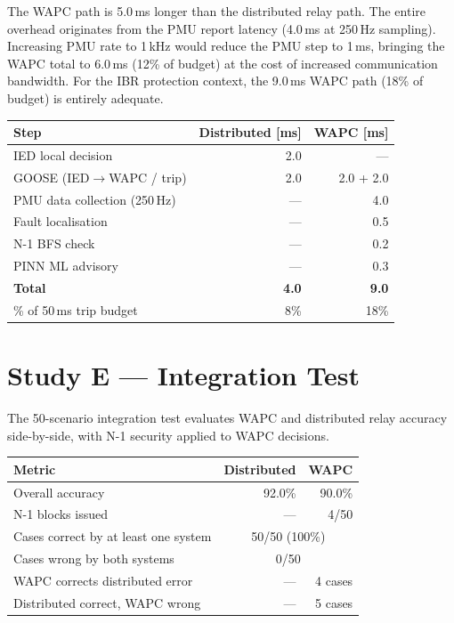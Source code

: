 \documentclass[11pt,a4paper]{article}
\begin{document}
\noindent
The WAPC path is 5.0\,ms longer than the distributed relay path.  The entire
overhead originates from the PMU report latency (4.0\,ms at 250\,Hz sampling).
Increasing PMU rate to 1\,kHz would reduce the PMU step to 1\,ms, bringing
the WAPC total to 6.0\,ms (12\% of budget) at the cost of increased
communication bandwidth.  For the IBR protection context, the 9.0\,ms WAPC
path (18\% of budget) is entirely adequate.

\begin{center}
\begin{tabular}{@{}lrr@{}}
\toprule
Step & Distributed [ms] & WAPC [ms] \\
\midrule
IED local decision & 2.0 & --- \\
GOOSE (IED$\to$WAPC / trip) & 2.0 & 2.0 + 2.0 \\
PMU data collection (250\,Hz) & --- & 4.0 \\
Fault localisation & --- & 0.5 \\
N-1 BFS check & --- & 0.2 \\
PINN ML advisory & --- & 0.3 \\
\midrule
\textbf{Total} & \textbf{4.0} & \textbf{9.0} \\
\% of 50\,ms trip budget & 8\% & 18\% \\
\bottomrule
\end{tabular}
\end{center}

\section{Study E --- Integration Test}
\label{sec:studyE}

The 50-scenario integration test evaluates WAPC and distributed relay
accuracy side-by-side, with N-1 security applied to WAPC decisions.

\begin{center}
\begin{tabular}{@{}lrr@{}}
\toprule
Metric & Distributed & WAPC \\
\midrule
Overall accuracy & 92.0\% & 90.0\% \\
N-1 blocks issued & --- & 4/50 \\
Cases correct by at least one system & \multicolumn{2}{c}{50/50 (100\%)} \\
Cases wrong by both systems & \multicolumn{2}{c}{0/50} \\
\midrule
WAPC corrects distributed error & --- & 4 cases \\
Distributed correct, WAPC wrong & --- & 5 cases \\
\bottomrule
\end{tabular}
\end{center}
\end{document}
